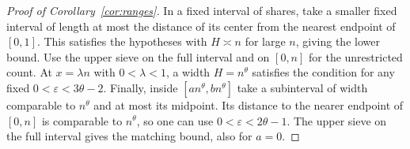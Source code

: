 \begin{proof}[Proof of Corollary~\ref{cor:ranges}]
In a fixed interval of shares, take a smaller fixed interval
of length at most the distance of its center from the nearest
endpoint of \([0,1]\). This satisfies the hypotheses with
\(H\asymp n\) for large \(n\), giving the lower bound. Use the
upper sieve on the full interval and on \([0,n]\) for the
unrestricted count.
At \(x=\lambda n\) with \(0<\lambda<1\), a width \(H=n^\theta\)
satisfies the condition for any fixed
\(0<\varepsilon<3\theta-2\).
Finally, inside \([a n^\theta,b n^\theta]\) take a subinterval
of width comparable to \(n^\theta\) and at most its midpoint.
Its distance to the nearer endpoint of \([0,n]\) is comparable
to \(n^\theta\), so one can use \(0<\varepsilon<2\theta-1\).
The upper sieve on the full interval gives the matching bound,
also for \(a=0\).
\end{proof}
